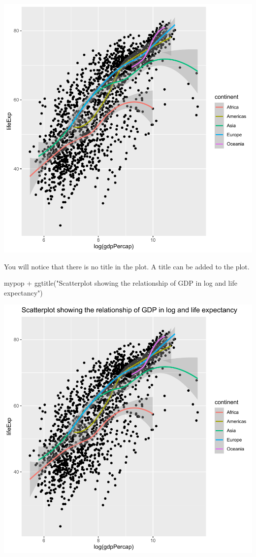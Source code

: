 \documentclass[
]{book}
\makeatletter
\newenvironment{Shaded}{\begin{snugshade}}{\end{snugshade}}
\newcommand{\FunctionTok}[1]{\textcolor[rgb]{0,0,0}{#1}}
\newcommand{\NormalTok}[1]{#1}
\newcommand{\SpecialCharTok}[1]{\textcolor[rgb]{0,0,0}{#1}}
\newcommand{\StringTok}[1]{\textcolor[rgb]{0.5,0.5,0.5}{#1}}
\newenvironment{kframe}{%
\medskip{}
\setlength{\fboxsep}{.8em}
 \def\at@end@of@kframe{}%
 \ifinner\ifhmode%
  \def\at@end@of@kframe{\end{minipage}}%
  \begin{minipage}{\columnwidth}%
 \fi\fi%
 \def\FrameCommand##1{\hskip\@totalleftmargin \hskip-\fboxsep
 \colorbox{shadecolor}{##1}\hskip-\fboxsep
     \hskip-\linewidth \hskip-\@totalleftmargin \hskip\columnwidth}%
 \MakeFramed {\advance\hsize-\width
   \@totalleftmargin\z@ \linewidth\hsize
   \@setminipage}}%
 {\par\unskip\endMakeFramed%
 \at@end@of@kframe}
\renewenvironment{Shaded}{\begin{kframe}}{\end{kframe}}
\makeatother
\begin{document}
\begin{center}\includegraphics[width=0.7\linewidth,keepaspectratio]{Multivariable_Data_Analysis_files/figure-latex/unnamed-chunk-36-1} \end{center}

You will notice that there is no title in the plot. A title can be added to the plot.

\begin{Shaded}
\begin{Highlighting}[]
\NormalTok{mypop }\SpecialCharTok{+} \FunctionTok{ggtitle}\NormalTok{(}\StringTok{"Scatterplot showing the relationship of GDP in log and life expectancy"}\NormalTok{)}
\end{Highlighting}
\end{Shaded}

\begin{center}\includegraphics[width=0.7\linewidth,keepaspectratio]{Multivariable_Data_Analysis_files/figure-latex/unnamed-chunk-37-1} \end{center}
\end{document}
